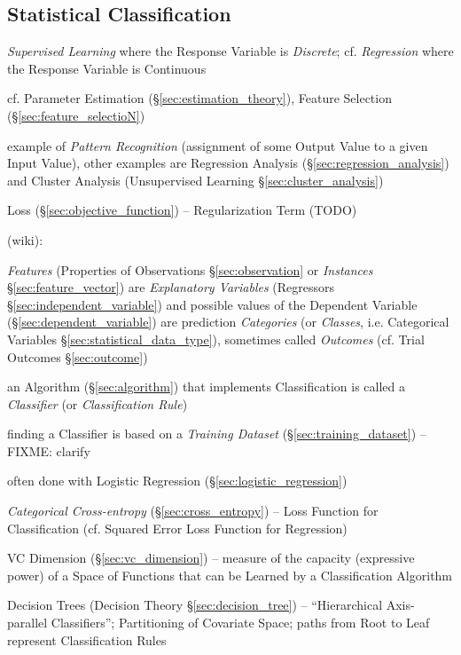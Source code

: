 \subsection{Statistical Classification}\label{sec:classification}

\emph{Supervised Learning} where the Response Variable is \emph{Discrete}; cf.
\emph{Regression} where the Response Variable is Continuous

cf. Parameter Estimation (\S\ref{sec:estimation_theory}), Feature Selection
(\S\ref{sec:feature_selectioN})

example of \emph{Pattern Recognition} (assignment of some Output Value to a
given Input Value), other examples are Regression Analysis
(\S\ref{sec:regression_analysis}) and Cluster Analysis (Unsupervised Learning
\S\ref{sec:cluster_analysis})

Loss (\S\ref{sec:objective_function}) -- Regularization Term (TODO)

(wiki):

\emph{Features} (Properties of Observations \S\ref{sec:observation} or
\emph{Instances} \S\ref{sec:feature_vector}) are \emph{Explanatory Variables}
(Regressors \S\ref{sec:independent_variable}) and possible values of the
Dependent Variable (\S\ref{sec:dependent_variable}) are prediction
\emph{Categories} (or \emph{Classes}, i.e. Categorical Variables
\S\ref{sec:statistical_data_type}), sometimes called \emph{Outcomes} (cf. Trial
Outcomes \S\ref{sec:outcome})

an Algorithm (\S\ref{sec:algorithm}) that implements Classification is called a
\emph{Classifier} (or \emph{Classification Rule})

finding a Classifier is based on a \emph{Training Dataset}
(\S\ref{sec:training_dataset}) --FIXME: clarify

often done with Logistic Regression (\S\ref{sec:logistic_regression})

\emph{Categorical Cross-entropy} (\S\ref{sec:cross_entropy}) -- Loss Function
for Classification (cf. Squared Error Loss Function for Regression)

\fist VC Dimension (\S\ref{sec:vc_dimension}) -- measure of the capacity
(expressive power) of a Space of Functions that can be Learned by a
Classification Algorithm

\fist Decision Trees (Decision Theory \S\ref{sec:decision_tree}) --
``Hierarchical Axis-parallel Classifiers''; Partitioning of Covariate Space;
paths from Root to Leaf represent Classification Rules

